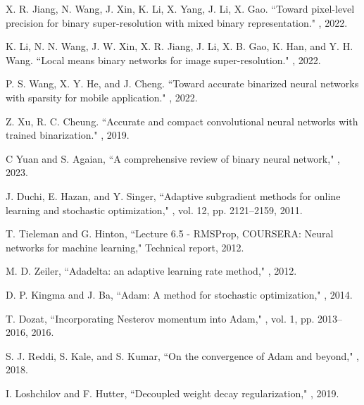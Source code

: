 \documentclass[journal]{IEEEtran}
\begin{document}
\begin{thebibliography}{99}
{
X. R. Jiang,  N. Wang, J. Xin, K. Li, X. Yang, J. Li, X. Gao.
\newblock  ``Toward pixel-level precision for binary super-resolution with mixed binary representation."
, 2022.

K. Li, N. N. Wang,  J. W. Xin, X. R. Jiang, J. Li, X. B. Gao, K. Han, and Y. H. Wang.
\newblock  ``Local means binary networks for image super-resolution."
, 2022.

P. S. Wang, X. Y. He, and J. Cheng.
\newblock  ``Toward accurate binarized neural networks with sparsity for mobile application."
, 2022.






}

Z. Xu, R. C. Cheung.
\newblock ``Accurate and compact convolutional neural networks with trained binarization."
,  2019.

C Yuan and S. Agaian,
\newblock  ``A comprehensive review of binary neural network,"
, 2023.

J. Duchi, E. Hazan, and Y. Singer,
\newblock  ``Adaptive subgradient methods for online learning
and stochastic optimization,"
, vol. 12, pp. 2121--2159, 2011.


T. Tieleman  and G. Hinton,
\newblock  ``Lecture 6.5 - RMSProp, COURSERA: Neural networks for machine learning,"
\newblock Technical report, 2012.


M. D. Zeiler,
\newblock  ``Adadelta: an adaptive learning rate method,"
, 2012.


 D. P. Kingma and  J. Ba,
\newblock  ``Adam: A method for stochastic optimization,"
, 2014.


T. Dozat,
\newblock  ``Incorporating Nesterov momentum into Adam,"
, vol. 1, pp. 2013--2016,
2016.


S. J. Reddi, S.  Kale,  and S. Kumar,
\newblock  ``On the convergence of Adam and beyond,"
, 2018.


I. Loshchilov and  F. Hutter,
\newblock  ``Decoupled weight decay regularization,"
, 2019.



\end{thebibliography}
\end{document}
